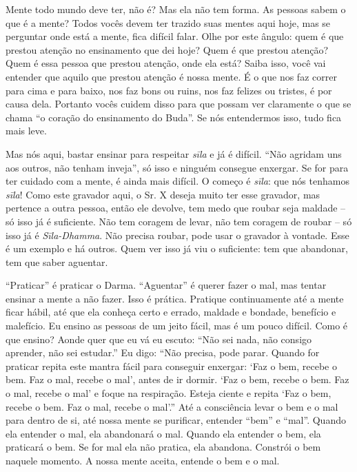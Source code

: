 Mente todo mundo deve ter, não é? Mas ela não tem forma. As pessoas
sabem o que é a mente? Todos vocês devem ter trazido suas mentes aqui
hoje, mas se perguntar onde está a mente, fica difícil falar. Olhe por
este ângulo: quem é que prestou atenção no ensinamento que dei hoje?
Quem é que prestou atenção? Quem é essa pessoa que prestou atenção,
onde ela está? Saiba isso, você vai entender que aquilo que prestou
atenção é nossa mente. É o que nos faz correr para cima e para baixo,
nos faz bons ou ruins, nos faz felizes ou tristes, é por causa dela.
Portanto vocês cuidem disso para que possam ver claramente o que se
chama “o coração do ensinamento do Buda”. Se nós entendermos isso, tudo
fica mais leve.

Mas nós aqui, bastar ensinar para respeitar \textit{sīla} e já é
difícil. “Não agridam uns aos outros, não tenham inveja”, só isso e
ninguém consegue enxergar. Se for para ter cuidado com a mente, é ainda
mais difícil. O começo é \textit{sīla}: que nós tenhamos
\textit{sīla}! Como este gravador aqui, o Sr. X deseja muito ter
esse gravador, mas pertence a outra pessoa, então ele devolve, tem medo
que roubar seja maldade – só isso já é suficiente.
Não tem coragem de levar, não tem coragem de roubar
– só isso já é \textit{Sīla-Dhamma}. Não precisa
roubar, pode usar o gravador à vontade. Esse é um exemplo e há outros.
Quem ver isso já viu o suficiente: tem que abandonar, tem que saber
aguentar. 

“Praticar” é praticar o Darma. “Aguentar” é querer fazer o mal, mas
tentar ensinar a mente a não fazer. Isso é prática. Pratique
continuamente até a mente ficar hábil, até que ela conheça certo e
errado, maldade e bondade, benefício e malefício. Eu ensino as pessoas
de um jeito fácil, mas é um pouco difícil. Como é que ensino? Aonde
quer que eu vá eu escuto: “Não sei nada, não consigo aprender, não sei
estudar.” Eu digo: “Não precisa, pode parar. Quando for praticar repita
este mantra fácil para conseguir enxergar: ‘Faz o bem, recebe o bem.
Faz o mal, recebe o mal’, antes de ir dormir. ‘Faz o bem, recebe o bem.
Faz o mal, recebe o mal’ e foque na respiração. Esteja ciente e repita
‘Faz o bem, recebe o bem. Faz o mal, recebe o mal’.” Até a consciência
levar o bem e o mal para dentro de si, até nossa mente se purificar,
entender “bem” e “mal”. Quando ela entender o mal, ela abandonará o
mal. Quando ela entender o bem, ela praticará o bem. Se for mal ela não
pratica, ela abandona. Constrói o bem naquele momento. A nossa mente
aceita, entende o bem e o mal. 

